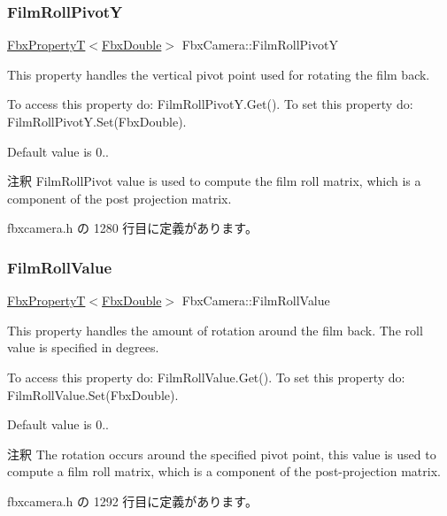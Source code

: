 \subsubsection{\texorpdfstring{Film\+Roll\+PivotY}{FilmRollPivotY}}
{\footnotesize\ttfamily \hyperlink{class_fbx_property_t}{Fbx\+PropertyT}$<$\hyperlink{fbxtypes_8h_a171e72a1c46fc15c1a6c9c31948c1c5b}{Fbx\+Double}$>$ Fbx\+Camera\+::\+Film\+Roll\+PivotY}

This property handles the vertical pivot point used for rotating the film back.

To access this property do\+: Film\+Roll\+Pivot\+Y.\+Get(). To set this property do\+: Film\+Roll\+Pivot\+Y.\+Set(\+Fbx\+Double).

Default value is 0.. \begin{DoxyRemark}{注釈}
Film\+Roll\+Pivot value is used to compute the film roll matrix, which is a component of the post projection matrix. 
\end{DoxyRemark}


 fbxcamera.\+h の 1280 行目に定義があります。

\mbox{\label{class_fbx_camera_a80affb53985e548f42136ccd3b9d7a2e}} 
\subsubsection{\texorpdfstring{Film\+Roll\+Value}{FilmRollValue}}
{\footnotesize\ttfamily \hyperlink{class_fbx_property_t}{Fbx\+PropertyT}$<$\hyperlink{fbxtypes_8h_a171e72a1c46fc15c1a6c9c31948c1c5b}{Fbx\+Double}$>$ Fbx\+Camera\+::\+Film\+Roll\+Value}

This property handles the amount of rotation around the film back. The roll value is specified in degrees.

To access this property do\+: Film\+Roll\+Value.\+Get(). To set this property do\+: Film\+Roll\+Value.\+Set(\+Fbx\+Double).

Default value is 0.. \begin{DoxyRemark}{注釈}
The rotation occurs around the specified pivot point, this value is used to compute a film roll matrix, which is a component of the post-\/projection matrix. 
\end{DoxyRemark}


 fbxcamera.\+h の 1292 行目に定義があります。

